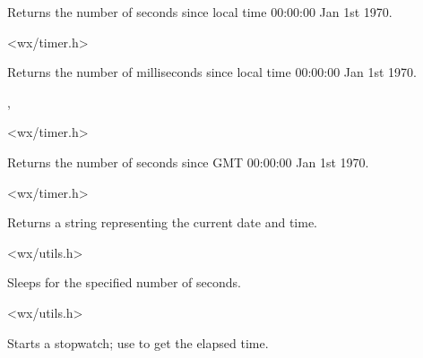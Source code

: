 
Returns the number of seconds since local time 00:00:00 Jan 1st 1970.




<wx/timer.h>

\label{wxgetlocaltimemillis}


Returns the number of milliseconds since local time 00:00:00 Jan 1st 1970.


,\\


<wx/timer.h>

\label{wxgetutctime}


Returns the number of seconds since GMT 00:00:00 Jan 1st 1970.




<wx/timer.h>

\label{wxnow}


Returns a string representing the current date and time.


<wx/utils.h>

\label{wxsleep}


Sleeps for the specified number of seconds.


<wx/utils.h>

\label{wxstarttimer}


Starts a stopwatch; use  to get the elapsed time.

